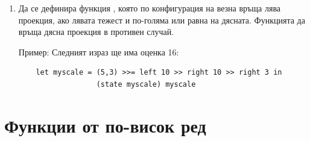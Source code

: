 \begin{enumerate}[resume]
	\item Да се дефинира функция , която по конфигурация на везна връща лява проекция, ако лявата тежест и по-голяма или равна на дясната. Функцията да връща дясна проекция в противен случай.
	
	Пример: Следният израз ще има оценка 16:
\begin{verbatim}
	let myscale = (5,3) >>= left 10 >> right 10 >> right 3 in 
				  (state myscale) myscale
\end{verbatim}
\end{enumerate}


\section {Функции от по-висок ред}


